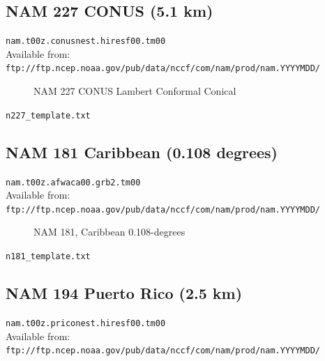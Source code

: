 \documentclass[11pt]{article}   %
\begin{document}
\clearpage
\subsection{NAM 227 CONUS (5.1 km)}

\verb|nam.t00z.conusnest.hiresf00.tm00|\\
Available from:\\
\verb|ftp://ftp.ncep.noaa.gov/pub/data/nccf/com/nam/prod/nam.YYYYMDD/|

\begin{figure}[htbp]\begin{center}
\parbox{15cm}{\caption{\label{FigNAM218}
NAM 227 CONUS Lambert Conformal Conical
}}
\end{center}\end{figure}
\clearpage
\verb|n227_template.txt| \\
\tiny  \normalsize

\clearpage
\subsection{NAM 181 Caribbean (0.108 degrees)}

\verb|nam.t00z.afwaca00.grb2.tm00|\\
Available from:\\
\verb|ftp://ftp.ncep.noaa.gov/pub/data/nccf/com/nam/prod/nam.YYYYMDD/|

\begin{figure}[htbp]\begin{center}
\parbox{15cm}{\caption{\label{FigNAM181}
NAM 181, Caribbean 0.108-degrees
}}
\end{center}\end{figure}
\clearpage
\verb|n181_template.txt| \\
\tiny  \normalsize


\clearpage
\subsection{NAM 194 Puerto Rico (2.5 km)}

\verb|nam.t00z.priconest.hiresf00.tm00|\\
Available from:\\
\verb|ftp://ftp.ncep.noaa.gov/pub/data/nccf/com/nam/prod/nam.YYYYMDD/|
\end{document}
